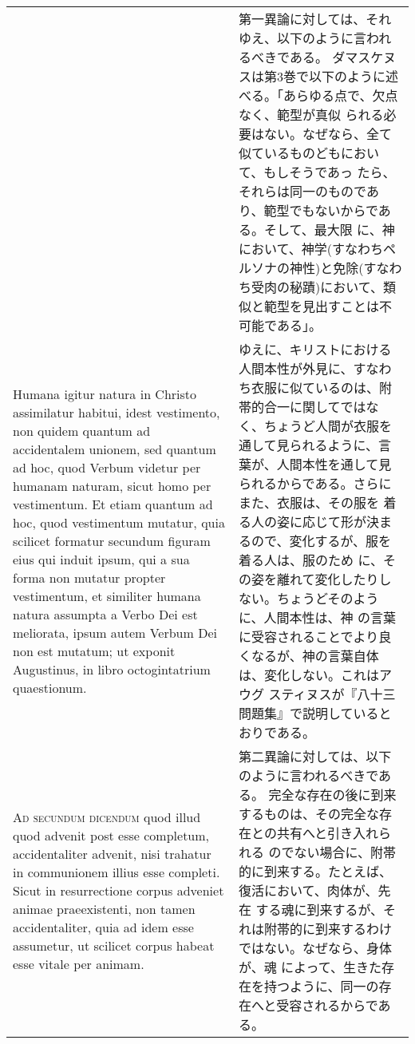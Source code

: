 \documentclass[10pt]{jsarticle} %
\begin{document}
\begin{longtable}{p{21em}p{21em}}
&

第一異論に対しては、それゆえ、以下のように言われるべきである。
ダマスケヌスは第3巻で以下のように述べる。「あらゆる点で、欠点なく、範型が真似
 られる必要はない。なぜなら、全て似ているものどもにおいて、もしそうであっ
 たら、それらは同一のものであり、範型でもないからである。そして、最大限
 に、神において、神学(すなわちペルソナの神性)と免除(すなわち受肉の秘蹟)において、類似と範型を見出すことは不可能である」。

\\



Humana igitur natura in Christo assimilatur habitui,
idest vestimento, non quidem quantum ad accidentalem unionem, sed
quantum ad hoc, quod Verbum videtur per humanam naturam, sicut homo per
vestimentum. Et etiam quantum ad hoc, quod vestimentum mutatur, quia
scilicet formatur secundum figuram eius qui induit ipsum, qui a sua
forma non mutatur propter vestimentum, et similiter humana natura
assumpta a Verbo Dei est meliorata, ipsum autem Verbum Dei non est
mutatum; ut exponit Augustinus, in libro octogintatrium quaestionum.

&

ゆえに、キリストにおける人間本性が外見に、すなわち衣服に似ているのは、附
 帯的合一に関してではなく、ちょうど人間が衣服を通して見られるように、言
 葉が、人間本性を通して見られるからである。さらにまた、衣服は、その服を
 着る人の姿に応じて形が決まるので、変化するが、服を着る人は、服のため
 に、その姿を離れて変化したりしない。ちょうどそのように、人間本性は、神
 の言葉に受容されることでより良くなるが、神の言葉自体は、変化しない。これはアウグ
 スティヌスが『八十三問題集』で説明しているとおりである。



\\



{\scshape Ad secundum dicendum} quod illud quod advenit post esse completum,
accidentaliter advenit, nisi trahatur in communionem illius esse
completi. Sicut in resurrectione corpus adveniet animae praeexistenti,
non tamen accidentaliter, quia ad idem esse assumetur, ut scilicet
corpus habeat esse vitale per animam. 


&

第二異論に対しては、以下のように言われるべきである。
完全な存在の後に到来するものは、その完全な存在との共有へと引き入れられる
 のでない場合に、附帯的に到来する。たとえば、復活において、肉体が、先在
 する魂に到来するが、それは附帯的に到来するわけではない。なぜなら、身体が、魂
 によって、生きた存在を持つように、同一の存在へと受容されるからである。




\end{longtable}
\end{document}
